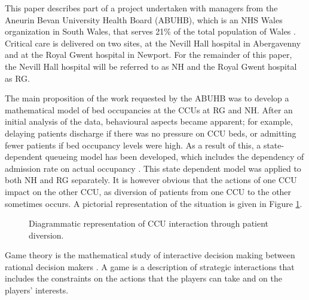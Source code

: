 \documentclass{article}
\begin{document}
This paper describes part of a project undertaken with managers from the Aneurin Bevan University Health Board (ABUHB), which is an NHS Wales organization in South Wales, that serves 21\% of the total population of Wales \cite{Board}.
Critical care is delivered on two sites, at the Nevill Hall hospital in Abergavenny and at the Royal Gwent hospital in Newport.
For the remainder of this paper, the Nevill Hall hospital will be referred to as NH and the Royal Gwent hospital as RG.

The main proposition of the work requested by the ABUHB was to develop a mathematical model of bed occupancies at the CCUs at RG and NH.
After an initial analysis of the data, behavioural aspects became apparent; for example, delaying patients discharge if there was no pressure on CCU beds, or admitting fewer patients if bed occupancy levels were high.
As a result of this, a state-dependent queueing model has been developed, which includes the dependency of admission rate on actual occupancy \cite{Komenda2013}.
This state dependent model was applied to both NH and RG separately.
It is however obvious that the actions of one CCU impact on the other CCU, as diversion of patients from one CCU to the other sometimes occurs.
A pictorial representation of the situation is given in Figure \ref{diagramofdiversion}.

\begin{figure}[!htbp]
\begin{center}
\caption{Diagrammatic representation of CCU interaction through patient diversion.}\label{diagramofdiversion}
\end{center}
\end{figure}

Game theory is the mathematical study of interactive decision making between rational decision makers \cite{Maschler2013}.
A game is a description of strategic interactions that includes the constraints on the actions that the players can take and on the players' interests.
\end{document}
